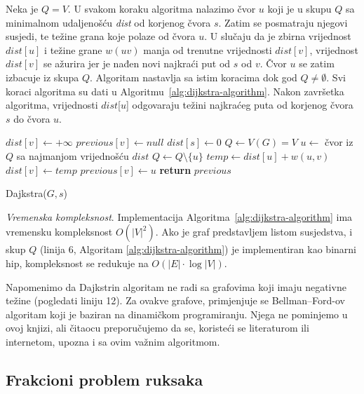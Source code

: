 \documentclass[a4paper, utf8, 11pt, colorlinks]{book}
\theoremstyle{definition}
\begin{document}
Neka je $Q = V$.  
U svakom koraku algoritma nalazimo čvor $u$ koji je u skupu $Q$ sa minimalnom udaljenošću \emph{dist} od korjenog čvora $s$. Zatim se posmatraju njegovi susjedi, te težine grana koje polaze od čvora $u$. U slučaju da je zbirna vrijednost $dist[u]$  i težine grane $w(uv)$ manja od trenutne vrijednosti $dist[v]$, vrijednost $dist[v]$ se ažurira jer je nađen novi najkraći put od $s$ od $v$.  Čvor $u$ se zatim izbacuje iz skupa $Q$. Algoritam nastavlja sa istim koracima dok god $Q \neq \emptyset$. 
Svi koraci algoritma su dati u Algoritmu~\ref{alg:dijkstra-algorithm}. Nakon završetka algoritma, vrijednosti $dist$[$u$] odgovaraju težini najkraćeg puta od korjenog čvora $s$ do čvora $u$. 


\begin{algorithm}[!ht]
	\begin{algorithmic}[1]
	      	\STATE   $dist[v] \gets +\infty$ 	%
		    \STATE $previous[v] \gets null$ 	%
		\ENDFOR
		\STATE	$dist[s] \gets 0$ 	 
		\STATE	$Q \gets V(G)=V$
		\STATE $u \gets$ čvor iz $Q$ sa najmanjom vrijednošću $dist$
		\STATE $Q \gets Q \setminus \{u\}$
		\STATE $temp \gets dist[u] + w(u, v)$
		\STATE  $dist[v] \gets temp$
		\STATE $previous[v] \gets u$ 
		\ENDIF
		\ENDFOR
		\ENDWHILE
		\STATE	\textbf{return} $previous$ 
	\end{algorithmic}
    		\caption{Dajkstra($G,s $)}\label{alg:dijkstra-algorithm}
\end{algorithm}

\emph{Vremenska kompleksnost}.  Implementacija Algoritma~\ref{alg:dijkstra-algorithm} ima vremensku kompleksnost $O(|V|^2)$. Ako je graf predstavljem listom susjedstva, i skup $Q$ (linija 6, Algoritam \ref{alg:dijkstra-algorithm}) je implementiran kao binarni hip, 
kompleksnost se redukuje na $O(|E| \cdot \log |V|)$.

Napomenimo da Dajkstrin algoritam ne radi sa grafovima koji imaju negativne težine (pogledati  liniju 12).  Za ovakve grafove,  primjenjuje se Bellman–Ford-ov algoritam koji je baziran na dinamičkom programiranju. Njega ne pominjemo   u ovoj knjizi, ali čitaocu preporučujemo da se, koristeći se literaturom ili internetom, upozna i sa ovim važnim algoritmom.  %

\subsection{Frakcioni problem ruksaka}
\end{document}
